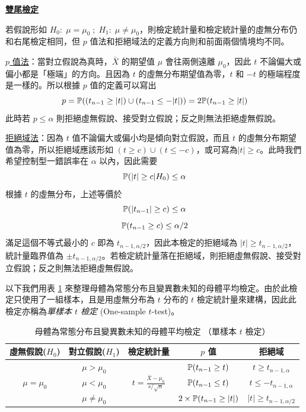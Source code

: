     \bigskip

    \noindent\underline{\textbf{雙尾檢定}}

    若假說形如 $H_0: \; \mu = \mu_0 \; ; \; H_1: \; \mu \ne \mu_0$，則檢定統計量和檢定統計量的虛無分布仍和右尾檢定相同，但 $p$ 值法和拒絕域法的定義方向則和前面兩個情境均不同。

    \noindent \underline{$p$ 值法}：當對立假說為真時，$\bar{X}$ 的期望值 $\mu$ 會往兩側遠離 $\mu_0$，因此 $t$ 不論偏大或偏小都是「極端」的方向。且因為 $t$ 的虛無分布期望值為零，$t$ 和 $-t$ 的極端程度是一樣的。所以根據 $p$ 值的定義可以寫出
    \smallskip
    \[p = \mathbb{P}((t_{n-1} \ge |t|)\cup(t_{n-1} \le -|t|)) = 2\mathbb{P}(t_{n-1} \ge |t|)\]
    \smallskip
    此時若 $p \le \alpha$ 則拒絕虛無假說、接受對立假說；反之則無法拒絕虛無假說。
    
    \noindent \underline{拒絕域法}：因為 $t$ 值不論偏大或偏小均是傾向對立假說，而且 $t$ 的虛無分布期望值為零，所以拒絕域應該形如 $(t \ge c)\cup(t \le -c)$，或可寫為$|t| \ge c$。此時我們希望控制型一錯誤率在 $\alpha$ 以內，因此需要
    \smallskip
    \[\mathbb{P}(|t| \ge c|H_0) \le \alpha\]
    \smallskip
    根據 $t$ 的虛無分布，上述等價於
    \smallskip
    \[\mathbb{P}(|t_{n-1}| \ge c) \le \alpha\]
    \[\mathbb{P}(t_{n-1} \ge c) \le \alpha/2\]
    \smallskip
    滿足這個不等式最小的 $c$ 即為 $t_{n-1,\alpha/2}$，因此本檢定的拒絕域為 $|t| \ge t_{n-1,\alpha/2}$，統計量臨界值為 $\pm t_{n-1,\alpha/2}$。若檢定統計量落在拒絕域，則拒絕虛無假說、接受對立假說；反之則無法拒絕虛無假說。

    \medskip
    
    以下我們用表 \ref{tab:one_sample_t} 來整理母體為常態分布且變異數未知的母體平均檢定。由於此檢定只使用了一組樣本，且是用虛無分布為 $t$ 分布的 $t$ 檢定統計量來建構，因此此檢定亦稱為\textit{單樣本 $t$ 檢定} (One-sample $t$-test)。

    \begin{table}[htbp]
        \begin{center}
            \begin{tabular}{ccccc}
                \toprule
                虛無假說($H_0$) & 對立假說($H_1$) & 檢定統計量 & $p$ 值 & 拒絕域\\
                \hline
                \multirow{3}{*}{$\mu = \mu_0$} & $\mu > \mu_0$ & \multirow{3}{*}{$t = \frac{\bar{X}-\mu_0}{s/\sqrt{n}}$} & $\mathbb{P}(t_{n-1} \ge t)$ & $t \ge t_{n-1,\alpha}$\\
                & $\mu < \mu_0$ & &$\mathbb{P}(t_{n-1} \le t)$&$t \le -t_{n-1,\alpha}$\\
                & $\mu \ne \mu_0$ & &$2\times\mathbb{P}(t_{n-1} \ge |t|)$&$|t| \ge t_{n-1,\alpha/2}$\\
                \bottomrule
            \end{tabular}
            \caption{母體為常態分布且變異數未知的母體平均檢定 （單樣本 $t$ 檢定）\label{tab:one_sample_t}}
        \end{center}
    \end{table}


